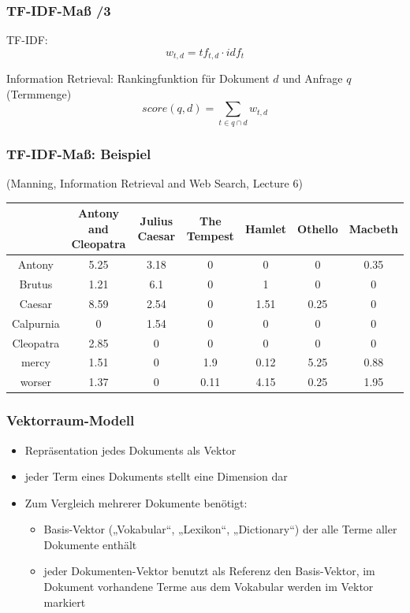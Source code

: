  
 \begin{frame}
    \frametitle{TF-IDF-Maß /3}
  
TF-IDF: $$w_{t,d} = tf_{t,d} \cdot idf_t$$

Information Retrieval: Rankingfunktion für Dokument $d$ und Anfrage $q$ (Termmenge) 
$$\textit{score}(q, d) = \sum_{t \in q \cap d} w_{t,d}$$

\end{frame}


 \begin{frame}
    \frametitle{TF-IDF-Maß: Beispiel}  

        (Manning, Information Retrieval and Web Search, Lecture 6)

{\tiny
    \begin{tabular}{ccccccc}
    & Antony and Cleopatra & Julius Caesar & The Tempest & Hamlet & Othello & Macbeth \\
    \hline
    Antony&5.25&3.18&0&0&0&0.35\\
Brutus&1.21&6.1&0&1&0&0\\
Caesar&8.59&2.54&0&1.51&0.25&0\\
Calpurnia&0&1.54&0&0&0&0\\
Cleopatra&2.85&0&0&0&0&0\\
mercy&1.51&0&1.9&0.12&5.25&0.88\\
worser&1.37&0&0.11&4.15&0.25&1.95
    \end{tabular}}
 \end{frame}
    
\begin{frame}
    \frametitle{Vektorraum-Modell}
    \begin{itemize}
    \item Repräsentation jedes Dokuments als Vektor
    \item jeder Term eines Dokuments stellt eine Dimension dar 
    \item Zum Vergleich mehrerer Dokumente benötigt:
    \begin{itemize}
    \item Basis-Vektor („Vokabular“, „Lexikon“, „Dictionary“) der alle Terme aller Dokumente enthält
    \item jeder Dokumenten-Vektor benutzt als Referenz den Basis-Vektor, im Dokument vorhandene Terme aus dem 
    Vokabular werden im Vektor markiert
    \end{itemize}
    \end{itemize}
\end{frame}
    
